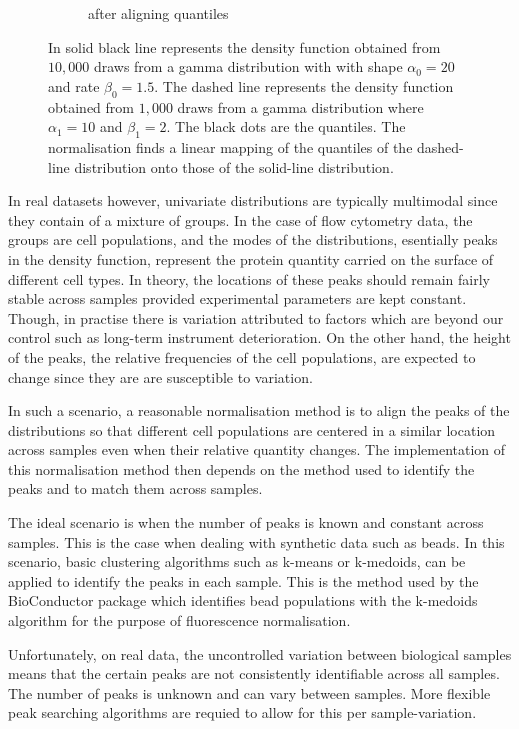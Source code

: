 \begin{figure}[ht]
\begin{subfigure}[b]{.5\textwidth}
\caption{after aligning quantiles}
\end{subfigure}
\caption{ \label{normalisation-quantile}
In solid black line represents the density function obtained from $10,000$ draws from a gamma distribution
with with shape $\alpha_0=20$ and rate $\beta_0=1.5$.
The dashed line represents the density function obtained from $1,000$ draws from a gamma distribution
where $\alpha_1=10$ and $\beta_1=2$.
The black dots are the quantiles.
The normalisation finds a linear mapping of the quantiles of the dashed-line distribution onto those of the solid-line distribution.
}
\end{figure}


In real datasets however, univariate distributions are typically multimodal since they contain of a mixture of groups.
In the case of flow cytometry data, the groups are cell populations, and the modes of the distributions, esentially peaks in the density function,
represent the protein quantity carried on the surface of different cell types.
In theory, the locations of these peaks should remain fairly stable across samples provided experimental parameters are kept constant.
Though, in practise there is variation attributed to factors which are beyond our control such as long-term instrument deterioration.
On the other hand, the height of the peaks, the relative frequencies of the cell populations, are expected to change since they are
are susceptible to variation.

In such a scenario, a reasonable normalisation method is to align the peaks of the distributions so that different cell populations are centered
in a similar location across samples even when their relative quantity changes.
The implementation of this normalisation method then depends on the method used to identify the peaks and to match them across samples.

The ideal scenario is when the number of peaks is known and constant across samples.
This is the case when dealing with synthetic data such as beads.
In this scenario, basic clustering algorithms such as k-means or k-medoids, can be applied to identify the peaks in each sample.
This is the method used by the  BioConductor package which identifies bead populations with the k-medoids algorithm
for the purpose of fluorescence normalisation.

Unfortunately, on real data, the uncontrolled variation between biological samples means that the certain peaks are not consistently identifiable across all samples.
The number of peaks is unknown and can vary between samples. 
More flexible peak searching algorithms are requied to allow for this per sample-variation.

